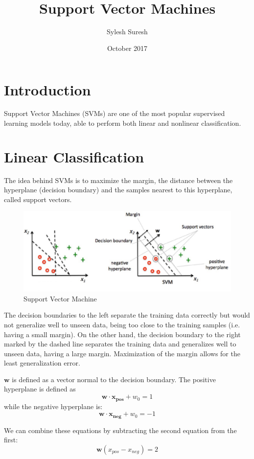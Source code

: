 \documentclass{article}
\title{Support Vector Machines}
\author{Sylesh Suresh}
\date{October 2017}
\begin{document}
\maketitle

\section{Introduction}
Support Vector Machines (SVMs) are one of the most popular supervised learning models today, able to perform both linear and nonlinear classification.
\section{Linear Classification}
The idea behind SVMs is to maximize the margin, the distance between the hyperplane (decision boundary) and the samples nearest to this hyperplane, called support vectors. 
\begin{figure}[h!]
\centering
\includegraphics[scale=0.4]{svm.jpg}
\caption{Support Vector Machine}
\label{fig:svm}
\end{figure}
The decision boundaries to the left separate the training data correctly but would not generalize well to unseen data, being too close to the training samples (i.e. having a small margin). On the other hand, the decision boundary to the right marked by the dashed line separates the training data and generalizes well to unseen data, having a large margin. Maximization of the margin allows for the least generalization error.

$\bm{w}$ is defined as a vector normal to the decision boundary. 
The positive hyperplane is defined as
\[ \bm{w \cdot x_{pos}} + w_0 = 1 \]
while the negative hyperplane is:
\[ \bm{w \cdot x_{neg}} + w_0 = -1 \]

We can combine these equations by subtracting the second equation from the first:
\begin{equation} \label{eq:hyperplanes}
\bm{w}{(x_{pos} - x_{neg})} = 2 
\end{equation}
\end{document}
